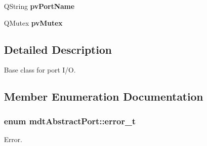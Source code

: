 \begin{DoxyCompactItemize}
\item 
\hypertarget{classmdt_abstract_port_afb8f8a723ff2db5141f18750020a7ee9}{
QString {\bfseries pvPortName}}
\label{classmdt_abstract_port_afb8f8a723ff2db5141f18750020a7ee9}

\item 
\hypertarget{classmdt_abstract_port_a357bce65bc031fffa87090a26ab88a08}{
QMutex {\bfseries pvMutex}}
\label{classmdt_abstract_port_a357bce65bc031fffa87090a26ab88a08}

\end{DoxyCompactItemize}


\subsection{Detailed Description}
Base class for port I/O. 

\subsection{Member Enumeration Documentation}
\hypertarget{classmdt_abstract_port_ad4121bb930c95887e77f8bafa065a85e}{
\subsubsection[{error\_\-t}]{\setlength{\rightskip}{0pt plus 5cm}enum {\bf mdtAbstractPort::error\_\-t}}}
\label{classmdt_abstract_port_ad4121bb930c95887e77f8bafa065a85e}


Error. 

